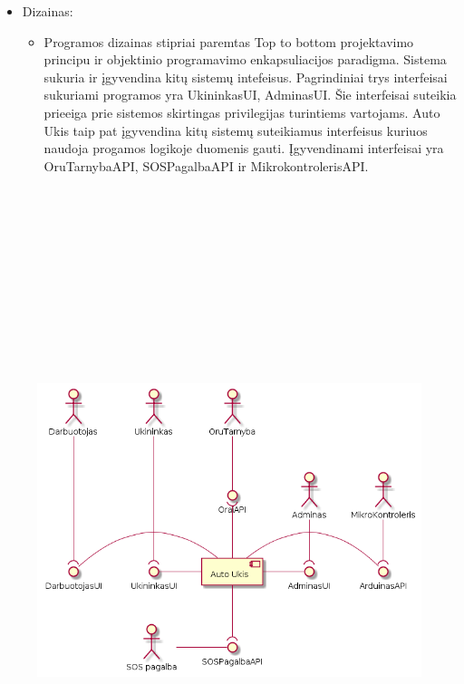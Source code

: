 \documentclass[oneside]{VUMIFPSkursinis}
\begin{document}
	\begin{itemize}
		\item Dizainas:
		\begin{itemize}
			\item Programos dizainas stipriai paremtas Top to bottom projektavimo principu ir objektinio programavimo enkapsuliacijos paradigma. Sistema sukuria ir įgyvendina kitų sistemų intefeisus. Pagrindiniai trys interfeisai sukuriami programos yra UkininkasUI, AdminasUI. Šie interfeisai suteikia prieeiga prie sistemos skirtingas privilegijas turintiems vartojams. Auto Ukis taip pat įgyvendina kitų sistemų suteikiamus interfeisus kuriuos naudoja progamos logikoje duomenis gauti. Įgyvendinami interfeisai yra OruTarnybaAPI, SOSPagalbaAPI ir MikrokontrolerisAPI.
		\end{itemize}
	\end{itemize}

\begin{figure}[H]
		\centering	
	\includegraphics[width=17cm,height=20cm,keepaspectratio]{L0V2.png}
	\caption{}
	\label{fig:L0V2}
\end{figure}
	
\end{document}
